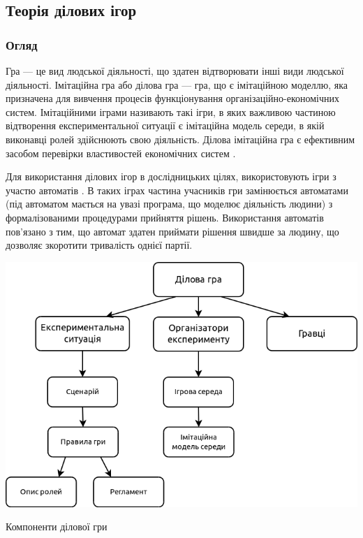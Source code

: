 \subsection{Теорія ділових ігор}
\subsubsection{Огляд}
Гра --- це вид людської діяльності, що здатен відтворювати інші види людської діяльності. Імітаційна гра або ділова гра --- гра, що є імітаційною моделлю, яка призначена для вивчення процесів функціонування організаційно-економічних систем. Імітаційними іграми називають такі ігри, в яких важливою частиною відтворення експериментальної ситуації є імітаційна модель середи, в якій виконавці ролей здійснюють свою діяльність\cite{aristov}. Ділова імітаційна гра є ефективним засобом перевірки властивостей економічних систем \cite{burkov}.

Для використання ділових ігор в дослідницьких цілях, використовують ігри з участю автоматів \cite{burkov}. В таких іграх частина учасників гри замінюється автоматами (під автоматом мається на увазі програма, що моделює діяльність людини) з формалізованими процедурами прийняття рішень. Використання автоматів пов’язано з тим, що автомат здатен приймати рішення швидше за людину, що дозволяє зкоротити тривалість однієї партії.

            \begin{stdfigure}
                \includegraphics[width=6in]{images/game.png}
                \caption{Компоненти ділової гри\cite{aristov}}
                \label{fig:game}
            \end{stdfigure}   

